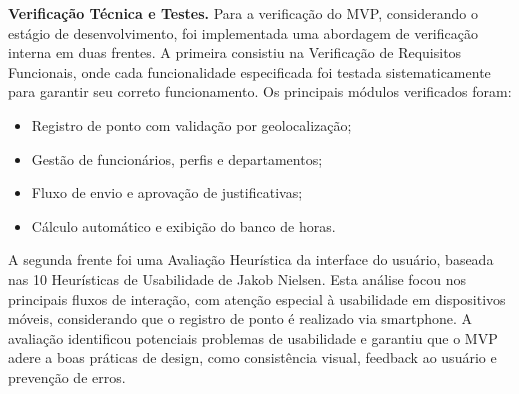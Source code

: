 \textbf{Verificação Técnica e Testes.} Para a verificação do MVP, considerando o estágio de desenvolvimento, foi implementada uma abordagem de verificação interna em duas frentes. A primeira consistiu na Verificação de Requisitos Funcionais, onde cada funcionalidade especificada foi testada sistematicamente para garantir seu correto funcionamento. Os principais módulos verificados foram:
\begin{itemize}
    \item Registro de ponto com validação por geolocalização;
    \item Gestão de funcionários, perfis e departamentos;
    \item Fluxo de envio e aprovação de justificativas;
    \item Cálculo automático e exibição do banco de horas.
\end{itemize}

A segunda frente foi uma Avaliação Heurística da interface do usuário, baseada nas 10 Heurísticas de Usabilidade de Jakob Nielsen. Esta análise focou nos principais fluxos de interação, com atenção especial à usabilidade em dispositivos móveis, considerando que o registro de ponto é realizado via smartphone. A avaliação identificou potenciais problemas de usabilidade e garantiu que o MVP adere a boas práticas de design, como consistência visual, feedback ao usuário e prevenção de erros.

